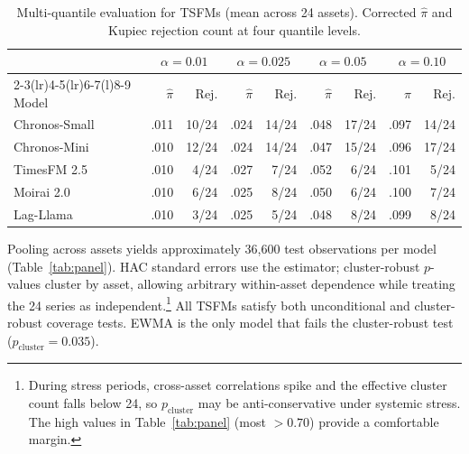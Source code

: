 \documentclass[preprint,11pt,authoryear]{elsarticle}
\newcommand{\1}{\boldsymbol{1}}
\begin{document}
	\begin{table}[H]
		\centering
		\caption{Multi-quantile evaluation for TSFMs (mean across 24 assets). Corrected $\hat\pi$ and Kupiec rejection count at four quantile levels.}
		\label{tab:multiquantile}
		\footnotesize
		\begin{tabular}{@{}l rr rr rr rr@{}}
			\toprule
			& \multicolumn{2}{c}{$\alpha=0.01$} & \multicolumn{2}{c}{$\alpha=0.025$} & \multicolumn{2}{c}{$\alpha=0.05$} & \multicolumn{2}{c}{$\alpha=0.10$} \\
			\cmidrule(lr){2-3}\cmidrule(lr){4-5}\cmidrule(lr){6-7}\cmidrule(l){8-9}
			Model & $\hat\pi$ & Rej. & $\hat\pi$ & Rej. & $\hat\pi$ & Rej. & $\hat\pi$ & Rej. \\
			\midrule
			Chronos-Small  & .011 & 10/24 & .024 & 14/24 & .048 & 17/24 & .097 & 14/24 \\
			Chronos-Mini   & .010 & 12/24 & .024 & 14/24 & .047 & 15/24 & .096 & 17/24 \\
			TimesFM 2.5    & .010 &  4/24 & .027 &  7/24 & .052 &  6/24 & .101 &  5/24 \\
			Moirai 2.0     & .010 &  6/24 & .025 &  8/24 & .050 &  6/24 & .100 &  7/24 \\
			Lag-Llama      & .010 &  3/24 & .025 &  5/24 & .048 &  8/24 & .099 &  8/24 \\
			\bottomrule
		\end{tabular}
	\end{table}
	
	Pooling across assets yields approximately 36,600 test
	observations per model (Table~\ref{tab:panel}). HAC standard
	errors use the \citet{newey1987simple} estimator;
	cluster-robust $p$-values cluster by asset, allowing arbitrary
	within-asset dependence while treating the 24 series as
	independent.\footnote{During stress periods, cross-asset
		correlations spike and the effective cluster count falls below
		24, so $p_{\text{cluster}}$ may be anti-conservative under
		systemic stress. The high values in Table~\ref{tab:panel}
		(most $> 0.70$) provide a comfortable margin.} All TSFMs
	satisfy both unconditional and cluster-robust coverage tests.
	EWMA is the only model that fails the cluster-robust test
	($p_{\text{cluster}} = 0.035$).
	
\end{document}
